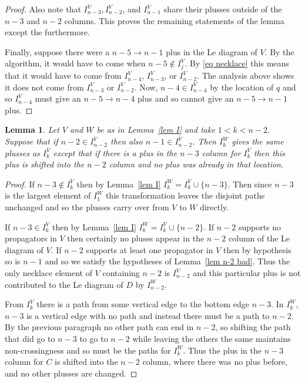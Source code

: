 \documentclass[11pt]{article}
\newtheorem{lem}[thm]{Lemma}
\theoremstyle{remark}
\theoremstyle{definition}
\begin{document}
\begin{proof}
  Also note that $I_{n-3}^{V}, I_{n-2}^{V}$, and $I_{n-1}^{V}$ share their plusses outside of the $n-3$ and $n-2$ columns.  This proves the remaining statements of the lemma except the furthermore.

  Finally, suppose there were a $n-5\rightarrow n-1$ plus in the Le diagram of $V$.  By the algorithm, it would have to come when $n-5 \not\in I_j^{V}$.  By \eqref{eq necklace} this means that it would have to come from $I_{n-4}^{V}$, $I_{n-3}^{V}$, or $I_{n-2}^{V}$. The analysis above shows it does not come from $I_{n-3}^{V}$ or $I_{n-2}^{V}$.   Now, $n-4\in I_{n-4}^{V}$ by the location of $q$ and so $I_{n-4}^{V}$ must give an $n-5\rightarrow n-4$ plus and so cannot give an $n-5\rightarrow n-1$ plus.

\end{proof}


\begin{lem}\label{lem other k}
  Let $V$ and $W$ be as in Lemma~\ref{lem I} and take $1<k<n-2$.  Suppose that if $n-2\in I_{n-2}^{V}$ then also $n-1\in I_{n-2}^{V}$.
  Then $I_k^{W}$ gives the same plusses as $I_{k}^{V}$ except that if there is a plus in the $n-3$ column for $I_{k}^{V}$ then this plus is shifted into the $n-2$ column and no plus was already in that location.
\end{lem}

\begin{proof}
  If $n-3\not\in I_{k}^{V}$ then by Lemma~\ref{lem I} $I_{k}^{W} = I_k^{V}\cup \{n-3\}$.  Then since $n-3$ is the largest element of $I_1^{W}$ this transformation leaves the disjoint paths unchanged and so the plusses carry over from $V$ to $W$ directly.

  If $n-3\in I_{k}^{V}$ then by Lemma~\ref{lem I} $I_{k}^{W} = I_k^{V}\cup \{n-2\}$.  If $n-2$ supports no propagators in $V$ then certainly no pluses appear in the $n-2$ column of the Le diagram of $V$.  If $n-2$ supports at least one propagator in $V$ then by hypothesis so is $n-1$ and so we satisfy the hypotheses of Lemma~\ref{lem n-2 bad}.  Thus the only necklace element of $V$ containing $n-2$ is $I_{n-2}^{V}$ and this particular plus is not contributed to the Le diagram of $D$ by $I_{n-2}^{W}$.

  {}From $I_{k}^{V}$ there is a path from some vertical edge to the bottom edge $n-3$.  In $I_{k}^{W}$, $n-3$ is a vertical edge with no path and instead there must be a path to $n-2$.  By the previous paragraph no other path can end in $n-2$, so shifting the path that did go to $n-3$ to go to $n-2$ while leaving the others the same maintains non-crossingness and so must be the paths for $I_{k}^{W}$.  Thus the plus in the $n-3$ column for $C$ is shifted into the $n-2$ column, where there was no plus before, and no other plusses are changed.
\end{proof}
\end{document}

